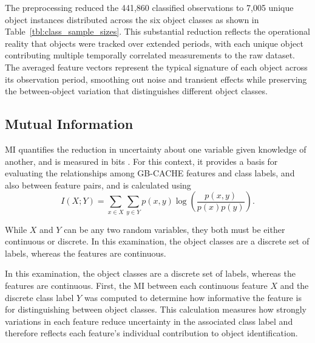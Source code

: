 \documentclass{erauthesis}
\begin{document}
The preprocessing reduced the 441,860 classified observations to 7,005 unique object instances distributed across the six object classes as shown in Table~\ref{tbl:class_sample_sizes}. This substantial reduction reflects the operational reality that objects were tracked over extended periods, with each unique object contributing multiple temporally correlated measurements to the raw dataset. 
The averaged feature vectors represent the typical signature of each object across its observation period, smoothing out noise and transient effects while preserving the between-object variation that distinguishes different object classes.

\subsection{Mutual Information}
  
\Ac{MI} quantifies the reduction in uncertainty about one variable given knowledge of another, and is measured in bits \cite{shannon1948}. 
For this context, it provides a basis for evaluating the relationships among GB-CACHE features and class labels, and also between feature pairs, and is calculated using 
\begin{equation}
I(X;Y)
= \sum_{x \in X} \sum_{y \in Y}
p(x, y)
\log \left( \frac{p(x, y)}{p(x) p(y)} \right).
\end{equation}

While $X$ and $Y$ can be any two random variables, they both must be either continuous or discrete. In this examination, the object classes are a discrete set of labels, whereas the features are continuous. 

In this examination, the object classes are a discrete set of labels, whereas the features are continuous. First, the \ac{MI} between each continuous feature $X$ and the discrete class label $Y$ was computed to determine how informative the feature is for distinguishing between object classes. This calculation measures how strongly variations in each feature reduce uncertainty in the associated class label and therefore reflects each feature's individual contribution to object identification.
\end{document}
